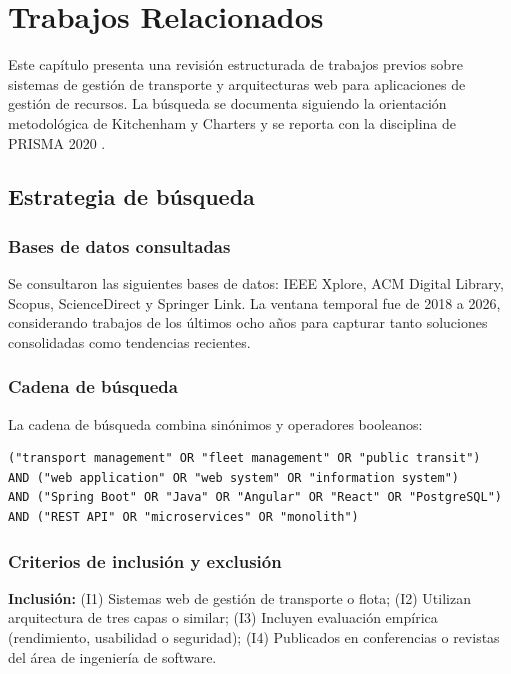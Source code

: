 \chapter{Trabajos Relacionados}
\label{cap:trabajos-relacionados}

Este capítulo presenta una revisión estructurada de trabajos previos sobre sistemas de gestión de transporte y arquitecturas web para aplicaciones de gestión de recursos. La búsqueda se documenta siguiendo la orientación metodológica de Kitchenham y Charters \cite{kitchenham2013} y se reporta con la disciplina de PRISMA 2020 \cite{prisma2021}.

\section{Estrategia de búsqueda}
\label{sec:estrategia-busqueda}

\subsection{Bases de datos consultadas}

Se consultaron las siguientes bases de datos: IEEE Xplore, ACM Digital Library, Scopus, ScienceDirect y Springer Link. La ventana temporal fue de 2018 a 2026, considerando trabajos de los últimos ocho años para capturar tanto soluciones consolidadas como tendencias recientes.

\subsection{Cadena de búsqueda}

La cadena de búsqueda combina sinónimos y operadores booleanos:

\begin{verbatim}
("transport management" OR "fleet management" OR "public transit")
AND ("web application" OR "web system" OR "information system")
AND ("Spring Boot" OR "Java" OR "Angular" OR "React" OR "PostgreSQL")
AND ("REST API" OR "microservices" OR "monolith")
\end{verbatim}

\subsection{Criterios de inclusión y exclusión}

\textbf{Inclusión:} (I1) Sistemas web de gestión de transporte o flota; (I2) Utilizan arquitectura de tres capas o similar; (I3) Incluyen evaluación empírica (rendimiento, usabilidad o seguridad); (I4) Publicados en conferencias o revistas del área de ingeniería de software.

